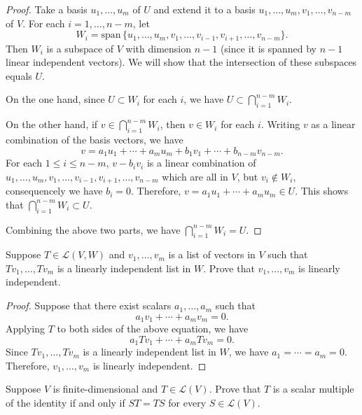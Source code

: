 \documentclass{article}
\newcommand{\sspan}{\text{span}\,}
\begin{document}
\begin{proof}
    Take a basis \( u_1, \ldots, u_m \) of \( U \) and extend it to a basis \( u_1, \ldots, u_m, v_1, \ldots, v_{n-m} \) of \( V \). For each \( i = 1, \ldots, n - m \), let
    \[ W_i = \sspan\{u_1, \ldots, u_m, v_1, \ldots, v_{i-1}, v_{i+1}, \ldots, v_{n-m}\}. \]
    Then \( W_i \) is a subspace of \( V \) with dimension \( n - 1 \) (since it is spanned by \( n - 1 \) linear independent vectors). We will show that the intersection of these subspaces equals \( U \). \par
    On the one hand, since \( U \subset W_i \) for each \( i \), we have \( U \subset \bigcap_{i=1}^{n-m} W_i \). \par
    On the other hand, if \( v \in \bigcap_{i=1}^{n-m} W_i \), then \( v \in W_i \) for each \( i \). Writing \( v \) as a linear combination of the basis vectors, we have
    \[ v = a_1 u_1 + \cdots + a_m u_m + b_1 v_1 + \cdots + b_{n-m} v_{n-m}. \]
    For each $ 1\le i\le n-m  $, $ v-b_iv_i  $ is a linear combination of $ u_1, \ldots, u_m, v_1, \ldots, v_{i-1}, v_{i+1}, \ldots, v_{n-m} $ which are all in $ V $, but $ v_i\not\in W_i $, consequencely we have $ b_i=0 $. Therefore, \( v = a_1 u_1 + \cdots + a_m u_m \in U \). This shows that \( \bigcap_{i=1}^{n-m} W_i \subset U \). \par
    Combining the above two parts, we have \( \bigcap_{i=1}^{n-m} W_i = U \).
\end{proof}

\begin{problem}[3A-4]
    Suppose \( T \in \mathcal{L}(V, W) \) and \( v_1, \ldots, v_m \) is a list of vectors in \( V \) such that \( Tv_1, \ldots, Tv_m \) is a linearly independent list in \( W \). Prove that \( v_1, \ldots, v_m \) is linearly independent.
\end{problem}

\begin{proof}
    Suppose that there exist scalars \( a_1, \ldots, a_m \) such that
    \[ a_1 v_1 + \cdots + a_m v_m = 0. \]
    Applying \( T \) to both sides of the above equation, we have
    \[ a_1 Tv_1 + \cdots + a_m Tv_m = 0. \]
    Since \( Tv_1, \ldots, Tv_m \) is a linearly independent list in \( W \), we have \( a_1 = \cdots = a_m = 0 \). Therefore, \( v_1, \ldots, v_m \) is linearly independent.
\end{proof}

\begin{problem}[3A-11]
    Suppose \( V \) is finite-dimensional and \( T \in \mathcal{L}(V) \). Prove that \( T \) is a scalar multiple of the identity if and only if \( ST = TS \) for every \( S \in \mathcal{L}(V) \).
\end{problem}
\end{document}

